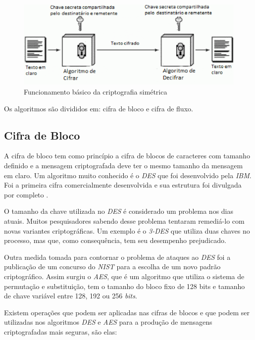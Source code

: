 \begin{figure}[h]
\centering
\includegraphics[scale=0.9]
{figuras/SymmetricCipher.eps}
\caption[Funcionamento básico da criptografia simétrica] {Funcionamento básico da criptografia simétrica\protect\footnotemark}
\end{figure}

Os algoritmos são divididos em: cifra de bloco e cifra de fluxo.

\subsection{Cifra de Bloco}
\label{block-cipher}

A cifra de bloco tem como princípio a cifra de blocos de caracteres com tamanho definido e a mensagem criptografada deve ter o mesmo tamanho da mensagem em claro. Um algoritmo muito conhecido é o \textit{DES} que foi desenvolvido pela \textit{IBM}. Foi a primeira cifra comercialmente desenvolvida e sua estrutura foi divulgada por completo \cite{alex-biryukov}. 

O tamanho da chave utilizada no \textit{DES} é considerado um problema nos dias atuais. Muitos pesquisadores sabendo desse problema tentaram remediá-lo com novas variantes criptográficas. Um exemplo é o \textit{3-DES} que utiliza duas chaves no processo, mas que, como consequência, tem seu desempenho prejudicado. 

Outra medida tomada para contornar o problema de ataques ao \textit{DES} foi a publicação de um concurso do \textit{NIST} para a escolha de um novo padrão criptográfico. Assim surgiu o \textit{AES}, que é um algoritmo que utiliza o sistema de permutação e substituição, tem o tamanho do bloco fixo de 128 bits e tamanho de chave variável entre 128, 192 ou 256 \textit{bits}. 

Existem operações que podem ser aplicadas nas cifras de blocos e que podem ser utilizadas nos algoritmos \textit{DES} e \textit{AES} para a produção de mensagens criptografadas mais seguras, são elas:

